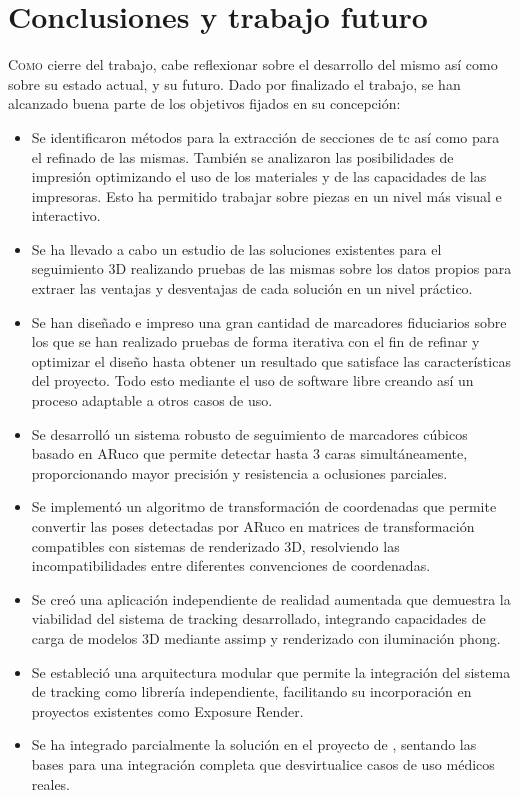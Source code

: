 \chapter{Conclusiones y trabajo futuro}\label{chap:c}
\lettrine{C}{omo} cierre del trabajo, cabe reflexionar sobre el desarrollo del mismo así como sobre su estado actual, y su futuro. Dado por finalizado el trabajo, se han alcanzado buena parte de los objetivos fijados en su concepción:

\begin{itemize}
	\item Se identificaron métodos para la extracción de secciones de \acrshort{tc} así como para el refinado de las mismas. También se analizaron las posibilidades de impresión optimizando el uso de los materiales y de las capacidades de las impresoras. Esto ha permitido trabajar sobre piezas en un nivel más visual e interactivo.
	\item Se ha llevado a cabo un estudio de las soluciones existentes para el seguimiento 3D realizando pruebas de las mismas sobre los datos propios para extraer las ventajas y desventajas de cada solución en un nivel práctico.
	\item Se han diseñado e impreso una gran cantidad de marcadores fiduciarios sobre los que se han realizado pruebas de forma iterativa con el fin de refinar y optimizar el diseño hasta obtener un resultado que satisface las características del proyecto. Todo esto mediante el uso de software libre creando así un proceso adaptable a otros casos de uso.
	\item Se desarrolló un sistema robusto de seguimiento de marcadores cúbicos basado en ARuco que permite detectar hasta 3 caras simultáneamente, proporcionando mayor precisión y resistencia a oclusiones parciales.
	\item Se implementó un algoritmo de transformación de coordenadas que permite convertir las poses detectadas por ARuco en matrices de transformación compatibles con sistemas de renderizado 3D, resolviendo las incompatibilidades entre diferentes convenciones de coordenadas.
	\item Se creó una aplicación independiente de realidad aumentada que demuestra la viabilidad del sistema de tracking desarrollado, integrando capacidades de carga de modelos 3D mediante \acrshort{assimp} y renderizado con iluminación \gls{phong}.
	\item Se estableció una arquitectura modular que permite la integración del sistema de tracking como librería independiente, facilitando su incorporación en proyectos existentes como Exposure Render.
	\item Se ha integrado parcialmente la solución en el proyecto de \citeauthor{IglesiasGuitian2022}, sentando las bases para una integración completa que desvirtualice casos de uso médicos reales.
\end{itemize}
